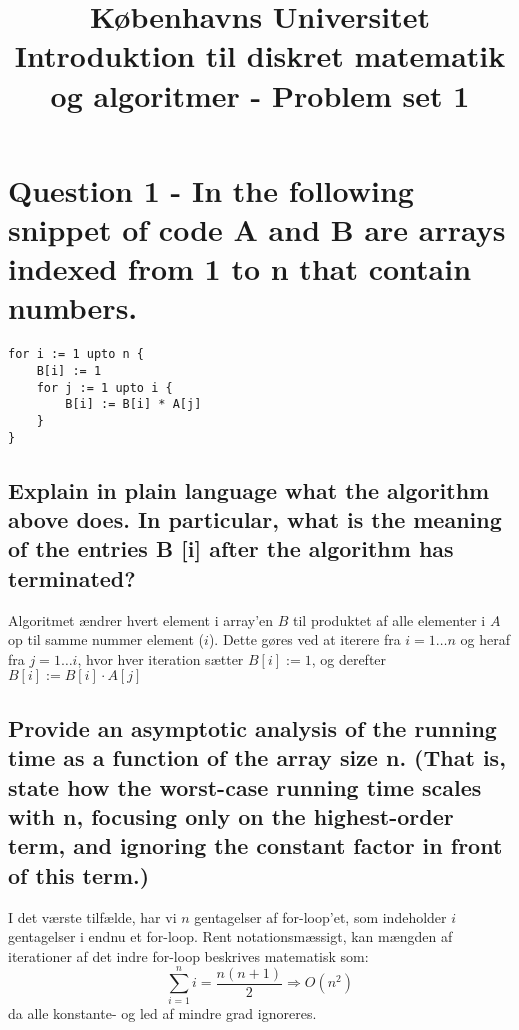 \documentclass[a4paper,12pt]{article}
\begin{document}
% 

\title{Københavns Universitet\\
Introduktion til diskret matematik og algoritmer - Problem set 1}
\maketitle %

\section[Question 1]{Question 1 - In the following snippet of code A and B are arrays indexed from 1 to n that contain numbers. }

\begin{lstlisting}
for i := 1 upto n { 
    B[i] := 1 
    for j := 1 upto i {
        B[i] := B[i] * A[j] 
    }
} 
\end{lstlisting}

\subsection[]{Explain in plain language what the algorithm above does. In particular, what is the meaning of the entries B [i] after the algorithm has terminated? }

Algoritmet ændrer hvert element i array'en $B$ til produktet af alle elementer i $A$ op til samme nummer element ($i$). Dette gøres ved at iterere fra $i=1\dots n$ og heraf fra $j=1\dots  i$, hvor hver iteration sætter $B[i] := 1$, og derefter $B[i] := B[i] \cdot A[j]$

\subsection[]{Provide an asymptotic analysis of the running time as a function of the array size n. (That is, state how the worst-case running time scales with n, focusing only on the highest-order term, and ignoring the constant factor in front of this term.)}

I det værste tilfælde, har vi $n$ gentagelser af for-loop'et, som indeholder $i$ gentagelser i endnu et for-loop. 
Rent notationsmæssigt, kan mængden af iterationer af det indre for-loop beskrives matematisk som:\\
\[\sum_{i=1}^{n}i=\dfrac{n(n+1)}{2} \Rightarrow O(n^2)\]
da alle konstante- og led af mindre grad ignoreres.
\end{document}
